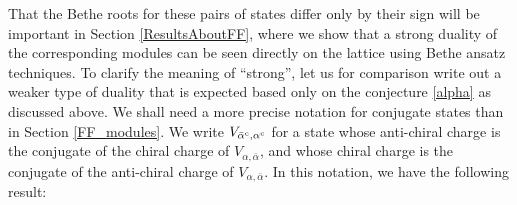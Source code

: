 \documentclass[a4paper,10pt]{article}
\newcommand{\linnea}[1]{$\framebox{\tiny L}$\ \textbf{\texttt{{\color{red}\footnotesize#1}}}}
\begin{document}
That the Bethe roots for these pairs of states differ only by their sign will be important in Section \ref{ResultsAboutFF}, where we show that a strong duality %
of the corresponding modules can be seen directly on the lattice using Bethe ansatz techniques. To clarify the meaning of ``strong'', let us for comparison write out a weaker type of duality that is expected based only on the conjecture \eqref{alpha} as discussed above. We shall need a more precise notation for conjugate states than in Section \ref{FF_modules}. 
We write $ V_{\bar{\alpha}^{\rm c},\alpha^{\rm c}} $ for a state whose anti-chiral charge is the conjugate of the chiral charge of $V_{\alpha,\bar{\alpha}}$, and whose chiral charge is the conjugate of the anti-chiral charge of $V_{\alpha,\bar{\alpha}}$.
%
% 
In this notation, we have the following result:
\end{document}
